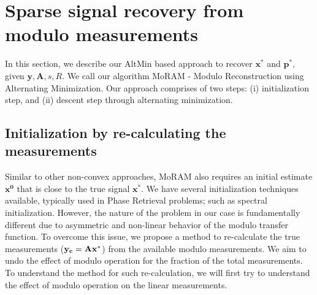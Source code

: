 \section{Sparse signal recovery from modulo measurements}
\label{sec:algo}
In this section, we describe our AltMin based approach to recover $\mathbf{x^*}$ and $\mathbf{p^*}$, given $\mathbf{y, A}, s, R$. We call our algorithm MoRAM - Modulo Reconstruction using Alternating Minimization. Our approach comprises of two steps: (i) initialization step, and (ii) descent step through alternating minimization.

\subsection{Initialization by re-calculating the measurements}
\label{sec:init}
Similar to other non-convex approaches, MoRAM also requires an initial estimate $\mathbf{{x}^0}$ that is close to the true signal $\mathbf{{x}^*}$. We have several initialization techniques available, typically used in Phase Retrieval problems; such as spectral initialization. However, the nature of the problem in our case is fundamentally different due to asymmetric and non-linear behavior of the modulo transfer function. To overcome this issue, we propose a method to re-calculate the true measurements ($\mathbf{y_c}= \mathbf{Ax^*}$) from the available modulo measurements. We aim to undo the effect of modulo operation for the fraction of the total measurements. To understand the method for such re-calculation, we will first try to understand the effect of modulo operation on the linear measurements.


